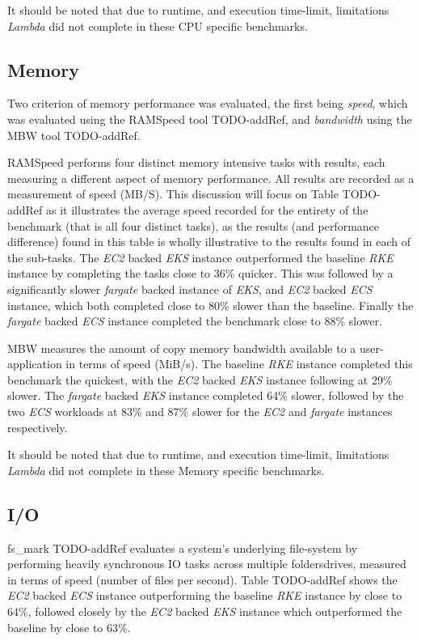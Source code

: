 \noindent \newline It should be noted that due to runtime, and execution time-limit, limitations \textit{Lambda} did not complete in these CPU specific benchmarks.

\subsection{Memory}
Two criterion of memory performance was evaluated, the first being \emph{speed},
which was evaluated using the RAMSpeed tool TODO-addRef, and \emph{bandwidth} using the MBW tool TODO-addRef.

RAMSpeed performs four distinct memory intensive tasks with results, each measuring a different aspect of memory performance.
All results are recorded as a measurement of speed (MB/S).
This discussion will focus on Table TODO-addRef as it illustrates the average speed recorded for the entirety of the benchmark (that is all four distinct tasks),
as the results (and performance difference) found in this table is wholly illustrative to the results found in each of the sub-tasks.
The \textit{EC2} backed \textit{EKS} instance outperformed the baseline \textit{RKE} instance by completing the tasks close to 36\% quicker.
This was followed by a significantly slower \textit{fargate} backed instance of \textit{EKS}, and \textit{EC2} backed \textit{ECS} instance,
which both completed close to 80\% slower than the baseline.
Finally the \textit{fargate} backed \textit{ECS} instance completed the benchmark close to 88\% slower.

\noindent \newline MBW measures the amount of copy memory bandwidth available to a user-application in terms of speed (MiB/s).
The baseline \textit{RKE} instance completed this benchmark the quickest, with the \textit{EC2} backed \textit{EKS} instance following at 29\% slower.
The \textit{fargate} backed \textit{EKS} instance completed 64\% slower,
followed by the two \textit{ECS} workloads at 83\% and 87\% slower for the \textit{EC2} and \textit{fargate} instances respectively.

\noindent \newline It should be noted that due to runtime, and execution time-limit, limitations \textit{Lambda} did not complete in these Memory specific benchmarks.

\subsection{I/O}
fs\_mark TODO-addRef evaluates a system's underlying file-system by performing heavily synchronous IO tasks across multiple folders\/drives, measured in terms of speed (number of files per second).
Table TODO-addRef shows the \textit{EC2} backed \textit{ECS} instance outperforming the baseline \textit{RKE} instance by close to 64\%,
followed closely by the \textit{EC2} backed \textit{EKS} instance which outperformed the baseline by close to 63\%.

